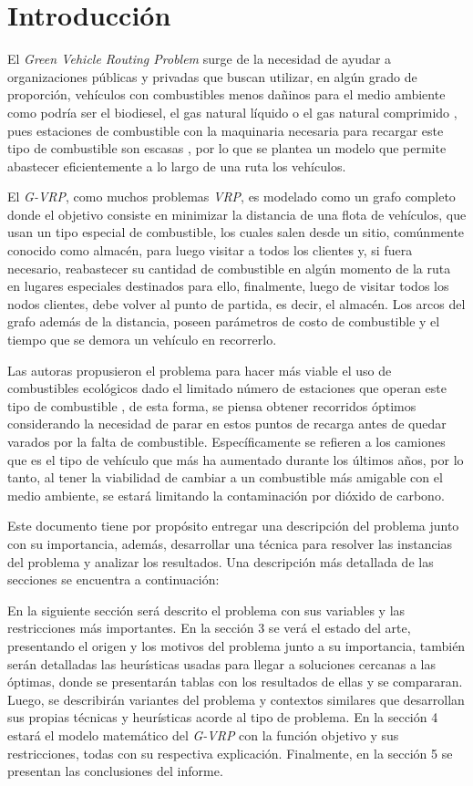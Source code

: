 \documentclass[letter, 10pt]{article}
\begin{document}
\section{Introducci\'on}
El \textit{Green Vehicle Routing Problem} surge de la necesidad de ayudar a organizaciones públicas y privadas que buscan utilizar, en algún grado de proporción, vehículos con combustibles menos dañinos para el medio ambiente como podría ser el biodiesel, el gas natural líquido o el gas natural comprimido \cite{E-VRPTW}, pues estaciones de combustible
con la maquinaria necesaria para recargar este tipo de combustible son escasas \cite{G-VRP}, por lo que se plantea un modelo que permite abastecer eficientemente a lo largo de una ruta los vehículos.

El \textit{G-VRP}\cite{G-VRP}, como muchos problemas \textit{VRP}, es modelado como un grafo completo donde el objetivo consiste en minimizar la distancia de una flota de vehículos, que usan un tipo especial de combustible, los cuales salen desde un sitio, comúnmente conocido como almacén, para luego visitar a todos los clientes y, si fuera necesario, reabastecer su cantidad de combustible en algún momento de la ruta en lugares especiales destinados para ello, finalmente, luego de visitar todos los nodos clientes, debe volver al punto de partida, es decir, el almacén. Los arcos del grafo además de la distancia, poseen parámetros de costo de combustible y el tiempo que se demora un vehículo en recorrerlo.

Las autoras propusieron el problema para hacer más viable el uso de combustibles ecológicos dado el limitado número de estaciones que operan este tipo de combustible \cite{AFVs}, de esta forma, se piensa obtener recorridos óptimos considerando la necesidad de parar en estos puntos de recarga antes de quedar varados por la falta de combustible. Específicamente se refieren a los camiones que es el tipo de vehículo que más ha aumentado durante los últimos años, por lo tanto, al tener la viabilidad de cambiar a un combustible más amigable con el medio ambiente, se estará limitando la contaminación por dióxido de carbono. 

Este documento tiene por propósito entregar una descripción del problema junto con su
importancia, además, desarrollar una técnica para resolver las instancias del problema y analizar los resultados. Una descripción más detallada de las secciones se encuentra a continuación:

En la siguiente sección será descrito el problema con sus variables y las restricciones más importantes.
En la sección 3 se verá el estado del arte, presentando el origen y los motivos del problema junto a su importancia,
también serán detalladas las heurísticas usadas para llegar a soluciones cercanas a las óptimas, donde se
presentarán tablas con los resultados de ellas y se compararan. Luego, se describirán variantes 
del problema y contextos similares que desarrollan sus propias técnicas
y heurísticas acorde al tipo de problema.
En la sección 4 estará el modelo matemático del \textit{G-VRP} con la función objetivo y sus restricciones, todas con su
respectiva explicación.
Finalmente, en la sección 5 se presentan las conclusiones del informe.
\end{document}
